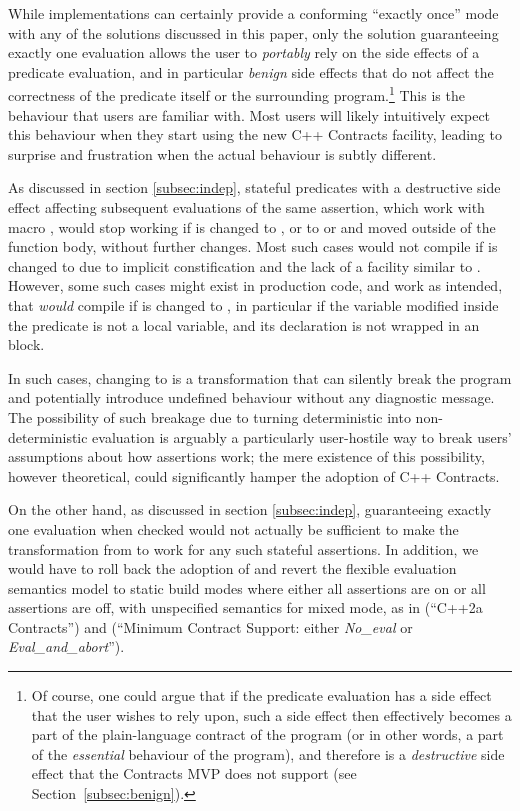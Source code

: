 While implementations can certainly provide a conforming ``exactly once'' mode with any of the solutions discussed in this paper, only the solution guaranteeing exactly one evaluation allows the user to \emph{portably} rely on the side effects of a predicate evaluation, and in particular \emph{benign} side effects that do not affect the correctness of the predicate itself or the surrounding program.\footnote{Of course, one could argue that if the predicate evaluation has a side effect that the user wishes to rely upon, such a side effect then effectively becomes a part of the plain-language contract of the program (or in other words, a part of the \emph{essential} behaviour of the program), and therefore is a \emph{destructive} side effect that the Contracts MVP does not support (see Section~\ref{subsec:benign}).} This is the behaviour that users are familiar with. Most users will likely intuitively expect this behaviour when they start using the new C++ Contracts facility, leading to surprise and frustration when the actual behaviour is subtly different. 

As discussed in section \ref{subsec:indep}, stateful predicates with a destructive side effect affecting subsequent evaluations of the same assertion, which work with macro , would stop working if  is changed to , or to  or  and moved outside of the function body, without further changes. Most such cases would not compile if  is changed to  due to implicit constification and the lack of a facility similar to . However, some such cases might exist in production code, and work as intended, that \emph{would} compile if  is changed to \mbox{}, in particular if the variable modified inside the predicate is not a local variable, and its declaration is not wrapped in an  block.

In such cases, changing  to \mbox{} is a transformation that can silently break the program and potentially introduce undefined behaviour without any diagnostic message. The possibility of such breakage due to turning deterministic into non-deterministic evaluation is arguably a particularly user-hostile way to break users' assumptions about how assertions work; the mere existence of this possibility, however theoretical, could significantly hamper the adoption of C++ Contracts.

On the other hand, as discussed in section \ref{subsec:indep}, guaranteeing exactly one evaluation when checked would not actually be sufficient to make the transformation from  to  work for any such stateful assertions. In addition, we would have to roll back the adoption of \cite{P2877R0} and revert the flexible evaluation semantics model to static build modes where either all assertions are on or all assertions are off, with unspecified semantics for mixed mode, as in \cite{P0542R5} (``C++2a Contracts'') and \cite{P2388R4} (``Minimum Contract Support: either \emph{No_eval} or \emph{Eval_and_abort}'').


